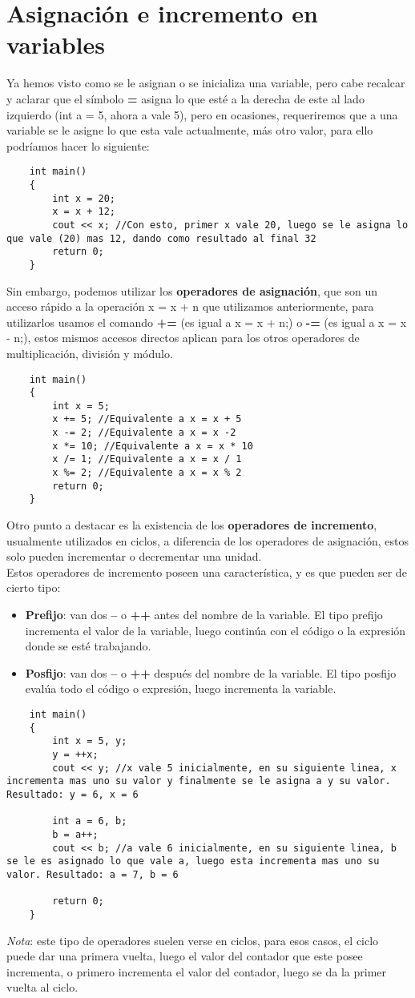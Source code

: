 \section{Asignación e incremento en variables}
Ya hemos visto como se le asignan o se inicializa una variable, pero cabe recalcar y aclarar que el símbolo \textbf{=} asigna lo que esté a la derecha de este al lado izquierdo (int a = 5, ahora a vale 5), pero en ocasiones, requeriremos que a una variable se le asigne lo que esta vale actualmente, más otro valor, para ello podríamos hacer lo siguiente:
\begin{lstlisting}
    int main()
    {
        int x = 20;
        x = x + 12;
        cout << x; //Con esto, primer x vale 20, luego se le asigna lo que vale (20) mas 12, dando como resultado al final 32
        return 0;
    }
\end{lstlisting}
Sin embargo, podemos utilizar los \textbf{operadores de asignación}, que son un acceso rápido a la operación x = x + n que utilizamos anteriormente, para utilizarlos usamos el comando \textbf{+=} (es igual a x = x + n;) o \textbf{-=} (es igual a x = x - n;), estos mismos accesos directos aplican para los otros operadores de multiplicación, división y módulo.
\begin{lstlisting}
    int main()
    {
        int x = 5;
        x += 5; //Equivalente a x = x + 5
        x -= 2; //Equivalente a x = x -2
        x *= 10; //Equivalente a x = x * 10
        x /= 1; //Equivalente a x = x / 1
        x %= 2; //Equivalente a x = x % 2
        return 0;
    }
\end{lstlisting}
Otro punto a destacar es la existencia de los \textbf{operadores de incremento}, usualmente utilizados en ciclos, a diferencia de los operadores de asignación, estos solo pueden incrementar o decrementar  una unidad.\\
Estos operadores de incremento poseen una característica, y es que pueden ser de cierto tipo:
\begin{itemize}
    \item \textbf{Prefijo}: van dos \textbf{--} o \textbf{++} antes del nombre de la variable. El tipo prefijo incrementa el valor de la variable, luego continúa con el código o la expresión donde se esté trabajando.
    \item \textbf{Posfijo}: van dos \textbf{--} o \textbf{++} después del nombre de la variable. El tipo posfijo evalúa todo el código o expresión, luego incrementa la variable.
\end{itemize}
\begin{lstlisting}
    int main()
    {
        int x = 5, y;
        y = ++x;
        cout << y; //x vale 5 inicialmente, en su siguiente linea, x incrementa mas uno su valor y finalmente se le asigna a y su valor. Resultado: y = 6, x = 6
        
        int a = 6, b;
        b = a++;
        cout << b; //a vale 6 inicialmente, en su siguiente linea, b se le es asignado lo que vale a, luego esta incrementa mas uno su valor. Resultado: a = 7, b = 6
        
        return 0;
    }
\end{lstlisting}
\textit{Nota}: este tipo de operadores suelen verse en ciclos, para esos casos, el ciclo puede dar una primera vuelta, luego el valor del contador que este posee incrementa, o primero incrementa el valor del contador, luego se da la primer vuelta al ciclo.

